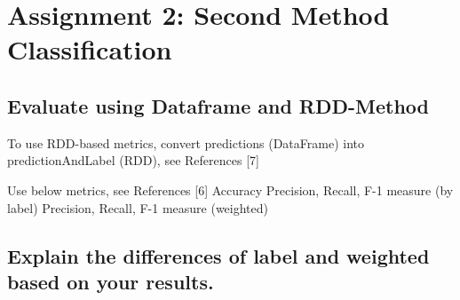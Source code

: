 \documentclass[]{article}
\begin{document}
\section*{Assignment 2: Second Method Classification}

\subsection*{Evaluate using Dataframe and RDD-Method}
To use RDD-based metrics, convert predictions (DataFrame) into predictionAndLabel (RDD), see References [7]

Use below metrics, see References [6]
	Accuracy
	Precision, Recall, F-1 measure (by label)
	Precision, Recall, F-1 measure (weighted)

\subsection*{Explain the differences of label and weighted based on your results.}
\end{document}
